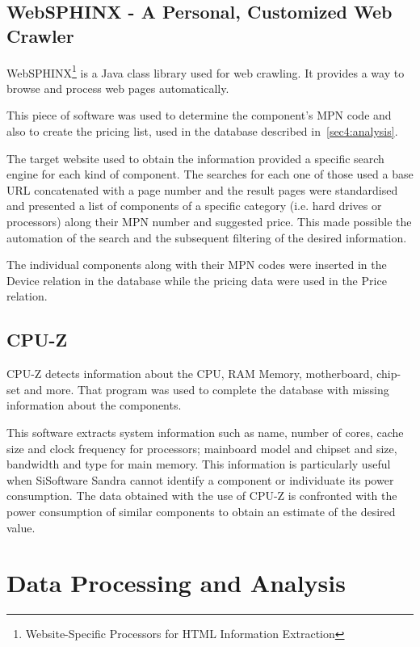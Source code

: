     \subsection{WebSPHINX - A Personal, Customized Web Crawler} \label{sec3:websphinx}
        WebSPHINX\footnote{Website-Specific Processors for HTML Information Extraction} is a Java class library used for web crawling. It provides a way to browse and process web pages automatically.
        
        This piece of software was used to determine the component's MPN code and also to create the pricing list, used in the database described in~\ref{sec4:analysis}.

        The target website used to obtain the information provided a specific search engine for each kind of component. The searches for each one of those used a base URL concatenated with a page number and the result pages were standardised and presented a list of components of a specific category (i.e. hard drives or processors) along their MPN number and suggested price. This made possible the automation of the search and the subsequent filtering of the desired information.\
        
        The individual components along with their MPN codes were inserted in the Device relation in the database while the pricing data were used in the Price relation.

    \subsection{CPU-Z} \label{sec3:cpu-z}
        CPU-Z detects information about the CPU, RAM Memory, motherboard, chip-set and more. That program was used to complete the database with missing information about the components.

        This software extracts system information such as name, number of cores, cache size and clock frequency for processors; mainboard model and chipset and size, bandwidth and type for main memory. This information is particularly useful when SiSoftware Sandra cannot identify a component or individuate its power consumption. The data obtained with the use of CPU-Z is confronted with the power consumption of similar components to obtain an estimate of the desired value.

\section{Data Processing and Analysis} \label{sec3:data_processing_analysis}
    
